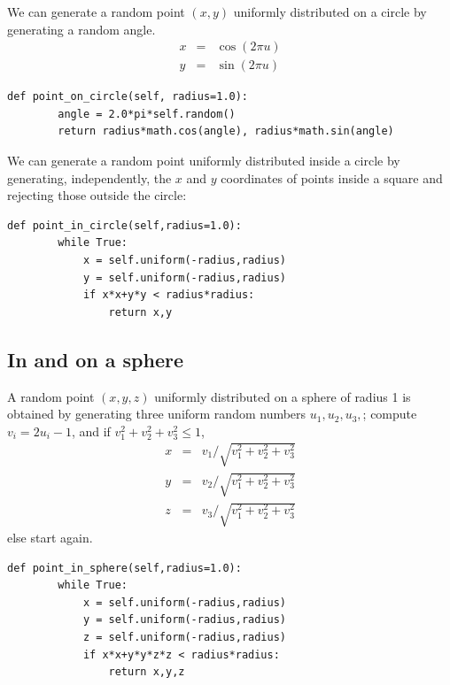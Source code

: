 \documentclass[justified,sixbynine]{tufte-book}
\def\ft{\small\tt}
\theoremstyle{plain}%
\theoremstyle{definition}
\theoremstyle{remark}
\begin{document}
\begin{fullwidth}
We can generate a random point $(x,y)$ uniformly distributed on a circle by generating a random angle.
\begin{eqnarray}
x &=&\cos (2\pi u) \\
y &=&\sin (2\pi u)
\end{eqnarray}

\begin{lstlisting}[caption={in file: {\ft nlib.py}}]
    def point_on_circle(self, radius=1.0):
        angle = 2.0*pi*self.random()
        return radius*math.cos(angle), radius*math.sin(angle)
\end{lstlisting}

We can generate a random point uniformly distributed inside a circle by generating, independently, the $x$ and $y$ coordinates of points inside a square and rejecting those outside the circle:

\begin{lstlisting}[caption={in file: {\ft nlib.py}}]
    def point_in_circle(self,radius=1.0):
        while True:
            x = self.uniform(-radius,radius)
            y = self.uniform(-radius,radius)
            if x*x+y*y < radius*radius:
                return x,y
\end{lstlisting}

\goodbreak\subsection{In and on a sphere}

A random point $(x,y,z)$ uniformly distributed on a sphere of radius 1 is
obtained by generating three uniform random numbers $u_1,u_2,u_3,$; compute $%
v_i=2u_i-1$, and if $v_1^2+v_2^2+v_3^2\leq 1$,
\begin{eqnarray}
x &=&v_1/\sqrt{v_1^2+v_2^2+v_3^2} \\
y &=&v_2/\sqrt{v_1^2+v_2^2+v_3^2} \\
z &=&v_3/\sqrt{v_1^2+v_2^2+v_3^2}
\end{eqnarray}
else start again.

\begin{lstlisting}[caption={in file: {\ft nlib.py}}]
    def point_in_sphere(self,radius=1.0):
        while True:
            x = self.uniform(-radius,radius)
            y = self.uniform(-radius,radius)
            z = self.uniform(-radius,radius)
            if x*x+y*y*z*z < radius*radius:
                return x,y,z


\end{lstlisting}
\end{fullwidth}
\end{document}
